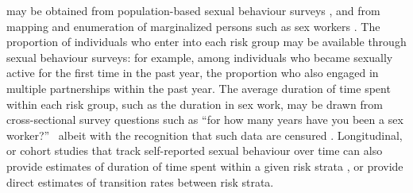 may be obtained from population-based sexual behaviour surveys \citep{DHS},
and from mapping and enumeration of marginalized persons
such as sex workers \citep{Abdul-Quader2014}.
The proportion of individuals who enter into each risk group
may be available through sexual behaviour surveys:
for example, among individuals who became sexually active for the first time in the past year,
the proportion who also engaged in multiple partnerships within the past year.
The average duration of time spent within each risk group, such as
the duration in sex work, may be drawn from
cross-sectional survey questions such as
``for how many years have you been a sex worker?''\ %
albeit with the recognition that such data are censured \citep{Watts2010}.
Longitudinal, or cohort studies that track
self-reported sexual behaviour over time can also provide
estimates of duration of time spent within a given risk strata \citep{Fergus2007},
or provide direct estimates of transition rates between risk strata.

